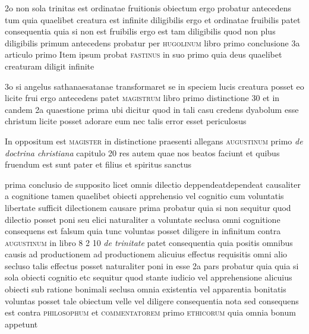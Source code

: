 \documentclass[twoside, openright]{article}
\newcommand{\name}[1]{\textsc{#1}}
\newcommand{\worktitle}[1]{\textit{#1}}
\begin{document}
        \pstart
        2o non sola trinitas est ordinatae fruitionis obiectum ergo probatur antecedens tum quia quaelibet creatura est infinite diligibilis ergo et ordinatae fruibilis patet consequentia quia si non est fruibilis ergo est tam diligibilis quod non plus diligibilis primum antecedens probatur per \name{hugolinum} libro primo conclusione 3a articulo primo  Item ipsum probat \name{fastinus} in suo primo quia deus quaelibet creaturam diligit infinite
        \pend
     
        \pstart
        3o si angelus sathanaesatanae transformaret se in speciem lucis creatura posset eo licite frui ergo antecedens patet  \name{magistrum} libro primo distinctione 30 et in candem 2a quaestione prima ubi dicitur quod in tali casu credens dyabolum esse christum licite posset adorare eum nec talis error esset periculosus
        \pend
     
        \pstart
        In oppositum est \name{magister} in distinctione praesenti  allegans \name{augustinum} primo \worktitle{de doctrina christiana} capitulo 20 res autem quae nos beatos faciunt et quibus fruendum est sunt pater et filius et spiritus sanctus
        \pend
     
        \pstart
        prima conclusio de supposito licet omnis dilectio deppendeatdependeat causaliter a cognitione tamen quaelibet obiecti apprehensio vel cognitio cum voluntatis libertate sufficit dilectionem causare  prima probatur quia si non sequitur quod dilectio posset poni seu elici naturaliter a voluntate seclusa omni cognitione consequens est falsum  quia tunc voluntas posset diligere in infinitum contra \name{augustinum} in libro 8 2 10 \worktitle{de trinitate} patet consequentia quia positis omnibus causis ad productionem ad productionem alicuius effectus requisitis omni alio secluso talis effectus posset naturaliter poni in esse 2a pars probatur quia quia si sola obiecti cognitio etc sequitur quod stante iudicio vel apprehensione alicuius obiecti sub ratione bonimali seclusa omnia existentia vel apparentia bonitatis voluntas posset tale obiectum velle vel diligere consequentia nota sed consequens est contra \name{philosophum} et \name{commentatorem} primo \name{ethicorum}\index[persons]{} quia omnia bonum appetunt
        \pend
     
\end{document}
